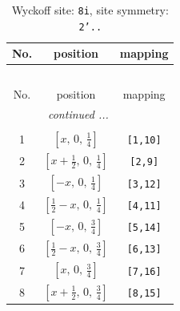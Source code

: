 \documentclass[fleqn,8pt]{jsarticle}
\begin{document}
\renewcommand{\arraystretch}{1.2}
\begin{longtable}{ccc}
\caption{Wyckoff site: {\tt 8i}, site symmetry: {\tt 2'..}}
 \\
 \hline \hline
No. & position & mapping \\ \hline \endfirsthead

\multicolumn{2}{l}{\tablename\ \thetable{}} \\
 \hline \hline
No. & position & mapping \\ \hline \endhead

 \hline \hline
\multicolumn{2}{r}{\footnotesize\it continued ...} \\ \endfoot

 \hline \hline
\multicolumn{2}{r}{} \\ \endlastfoot

1 & $\left[ x,\, 0,\, \frac{1}{4} \right]$ & {\tt [1,10]} \\ \hline
2 & $\left[ x + \frac{1}{2},\, 0,\, \frac{1}{4} \right]$ & {\tt [2,9]} \\ \hline
3 & $\left[ - x,\, 0,\, \frac{1}{4} \right]$ & {\tt [3,12]} \\ \hline
4 & $\left[ \frac{1}{2} - x,\, 0,\, \frac{1}{4} \right]$ & {\tt [4,11]} \\ \hline
5 & $\left[ - x,\, 0,\, \frac{3}{4} \right]$ & {\tt [5,14]} \\ \hline
6 & $\left[ \frac{1}{2} - x,\, 0,\, \frac{3}{4} \right]$ & {\tt [6,13]} \\ \hline
7 & $\left[ x,\, 0,\, \frac{3}{4} \right]$ & {\tt [7,16]} \\ \hline
8 & $\left[ x + \frac{1}{2},\, 0,\, \frac{3}{4} \right]$ & {\tt [8,15]} \\
\end{longtable}
\renewcommand{\arraystretch}{1.2}
\end{document}
